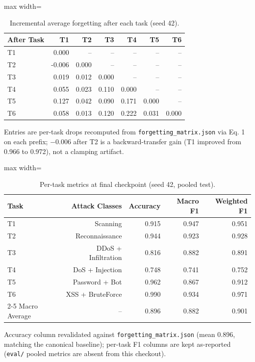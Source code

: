 \documentclass[11pt,a4paper]{article}
\begin{document}
\begin{table}[H]
\centering
\caption{Incremental average forgetting after each task (seed 42).}
\label{tab:incremental-forgetting}
\begin{adjustbox}{max width=\textwidth}
\begin{tabular}{lrrrrrr}
\toprule
After Task & T1 & T2 & T3 & T4 & T5 & T6 \\
\midrule
T1 & 0.000 & -- & -- & -- & -- & -- \\
T2 & -0.006 & 0.000 & -- & -- & -- & -- \\
T3 & 0.019 & 0.012 & 0.000 & -- & -- & -- \\
T4 & 0.055 & 0.023 & 0.110 & 0.000 & -- & -- \\
T5 & 0.127 & 0.042 & 0.090 & 0.171 & 0.000 & -- \\
T6 & 0.058 & 0.013 & 0.120 & 0.222 & 0.031 & 0.000 \\
\bottomrule
\end{tabular}
\end{adjustbox}
\end{table}
Entries are per-task drops recomputed from \texttt{forgetting\_matrix.json} via Eq. 1 on each prefix; \num{-0.006} after T2 is a backward-transfer gain (T1 improved from 0.966 to 0.972), not a clamping artifact.

\begin{table}[H]
\centering
\caption{Per-task metrics at final checkpoint (seed 42, pooled test).}
\label{tab:per-task-final}
\begin{adjustbox}{max width=\textwidth}
\begin{tabular}{lrrrr}
\toprule
Task & Attack Classes & Accuracy & Macro F1 & Weighted F1 \\
\midrule
T1 & Scanning & 0.915 & 0.947 & 0.951 \\
T2 & Reconnaissance & 0.944 & 0.923 & 0.928 \\
T3 & DDoS + Infiltration & 0.816 & 0.882 & 0.891 \\
T4 & DoS + Injection & 0.748 & 0.741 & 0.752 \\
T5 & Password + Bot & 0.962 & 0.867 & 0.912 \\
T6 & XSS + BruteForce & 0.990 & 0.934 & 0.971 \\
\cmidrule{2-5}
Macro Average & -- & 0.896 & 0.882 & 0.901 \\
\bottomrule
\end{tabular}
\end{adjustbox}
\end{table}
Accuracy column revalidated against \texttt{forgetting\_matrix.json} (mean \num{0.896}, matching the canonical baseline); per-task F1 columns are kept as-reported (\texttt{eval/} pooled metrics are absent from this checkout).
\end{document}
